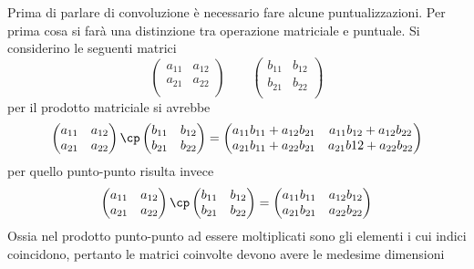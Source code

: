 \documentclass{subfiles}
\begin{document}
Prima di parlare di convoluzione è necessario fare alcune puntualizzazioni.
Per prima cosa si farà una distinzione tra operazione matriciale e puntuale. Si considerino le seguenti matrici
\[
    \begin{pmatrix}
        a_{11} & a_{12} \\
        a_{21} & a_{22} \\
    \end{pmatrix}
    \qquad
    \begin{pmatrix}
        b_{11} & b_{12} \\
        b_{21} & b_{22} \\
    \end{pmatrix}
\]
per il prodotto matriciale si avrebbe
\[
    \begin{pmatrix}
        a_{11} & a_{12} \\
        a_{21} & a_{22} \\
    \end{pmatrix}
    \cp
    \begin{pmatrix}
        b_{11} & b_{12} \\
        b_{21} & b_{22} \\
    \end{pmatrix}
    =
    \begin{pmatrix}
        a_{11}b_{11} + a_{12}b_{21} & a_{11}b_{12} + a_{12}b_{22} \\
        a_{21}b_{11} + a_{22}b_{21} & a_{21}b{12} + a_{22}b_{22}  \\
    \end{pmatrix}
\]
per quello punto-punto risulta invece
\[
    \begin{pmatrix}
        a_{11} & a_{12} \\
        a_{21} & a_{22} \\
    \end{pmatrix}
    \cp
    \begin{pmatrix}
        b_{11} & b_{12} \\
        b_{21} & b_{22} \\
    \end{pmatrix}
    =
    \begin{pmatrix}
        a_{11}b_{11} & a_{12}b_{12} \\
        a_{21}b_{21} & a_{22}b_{22} \\
    \end{pmatrix}
\]
Ossia nel prodotto punto-punto ad essere moltiplicati sono gli elementi i cui indici coincidono, pertanto le matrici coinvolte devono avere le medesime dimensioni
\end{document}
